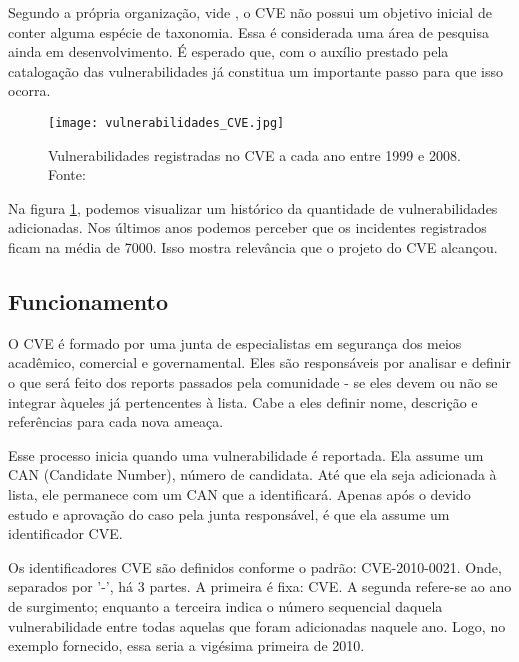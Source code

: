 			Segundo a própria organização, vide \cite{CVE2010}, o CVE não possui um objetivo 
			inicial de conter alguma espécie de taxonomia. Essa é considerada uma área de pesquisa
			ainda em desenvolvimento. É esperado que, com o auxílio prestado pela
			catalogação das vulnerabilidades já constitua um importante passo para que
			isso ocorra.

			\begin{figure}
				\begin{center}
					\texttt{[image: vulnerabilidades\_CVE.jpg]}
					\caption{Vulnerabilidades registradas no CVE a cada ano entre 1999 e 2008.
							Fonte: \cite{Florian2009}}
					\label{fig:vulnerabilidades_CVE}
				\end{center}
			\end{figure}

			
			Na figura \ref{fig:vulnerabilidades_CVE}, podemos visualizar um histórico
			da quantidade de vulnerabilidades adicionadas. Nos últimos anos podemos
			perceber que os incidentes registrados ficam na média de 7000.
			Isso mostra relevância que o projeto do CVE alcançou.
			
			 
		
		\subsection{Funcionamento}
			O CVE é formado por uma junta de especialistas em segurança dos meios acadêmico, comercial e
			governamental. Eles são responsáveis por analisar e definir o que será feito dos reports passados
			pela comunidade - se eles devem ou não se integrar àqueles já pertencentes à lista.
			Cabe a eles definir nome, descrição e referências para cada nova ameaça.


			Esse processo inicia quando uma vulnerabilidade é reportada.
			Ela assume um CAN (Candidate Number), número de candidata.
			Até que ela seja adicionada à lista, ele permanece com um CAN que
			a identificará. Apenas após o devido estudo e aprovação do caso pela junta
			responsável, é que ela assume um identificador CVE.

			
			Os identificadores CVE são definidos conforme o padrão: CVE-2010-0021.
			Onde, separados por '-', há 3 partes. A primeira é fixa: CVE.
			A segunda refere-se ao ano de surgimento; enquanto a terceira
			indica o número sequencial daquela vulnerabilidade entre todas
			aquelas que foram adicionadas naquele ano. Logo, no exemplo fornecido,
			essa seria a vigésima primeira de 2010.
		
